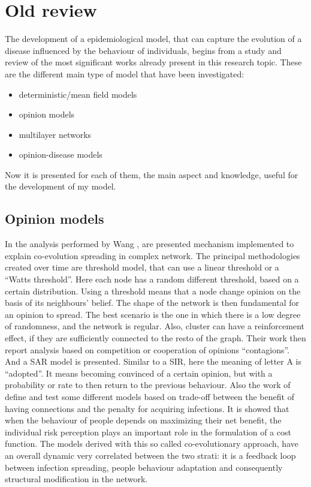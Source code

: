  
\chapter{Old review}

The development of a epidemiological model, that can capture the evolution of a disease influenced by the behaviour of individuals, begins from a study and review of the most significant works already present in this research topic.
These are the different main type of model that have been investigated:
\begin{itemize}
	\item deterministic/mean field models
	\item opinion models
	\item multilayer networks
	\item opinion-disease models	
\end{itemize}

Now it is presented for each of them, the main aspect and knowledge, useful for the development of my model.   

\section{Opinion models}
In the analysis performed by Wang \cite{Wang_2019}, are presented mechanism implemented to explain co-evolution spreading in complex network. The principal methodologies created over time are threshold model, that can use a linear threshold or a “Watts threshold”. Here each node has a random different threshold, based on a certain distribution. Using a threshold means that a node change opinion on the basis of its neighbours’ belief. The shape of the network is then fundamental for an opinion to spread. The best scenario is the one in which there is a low degree of randomness, and the network is regular. Also, cluster can have a reinforcement effect, if they are sufficiently connected to the resto of the graph. Their work then report analysis based on competition or cooperation of opinions “contagions”. And a SAR model is presented. Similar to a SIR, here the meaning of letter A is “adopted”. It means becoming convinced of a certain opinion, but with a probability or rate to then return to the previous behaviour. Also the work of \cite{Nunner2021} define and test some different models based on trade-off between the benefit of having connections and the penalty for acquiring infections. It is showed that when the behaviour of people depends on maximizing their net benefit, the individual risk perception plays an important role in the formulation of a cost function. The models derived with this so called co-evolutionary approach, have an overall dynamic very correlated between the two strati: it is a feedback loop between infection spreading, people behaviour adaptation and consequently structural modification in the network.


